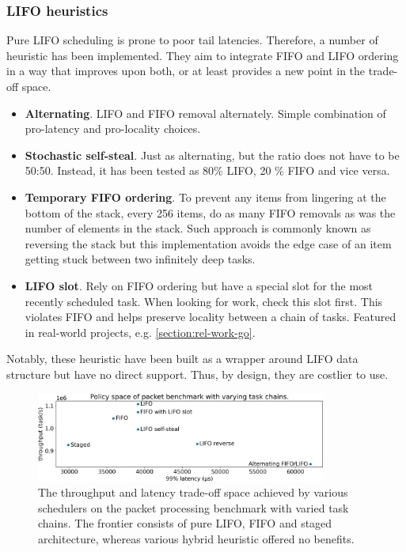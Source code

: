 \documentclass[12pt,a4paper,twoside]{report}
\begin{document}
\subsubsection{LIFO heuristics}
\label{section:lifo-heuristics}

Pure LIFO scheduling is prone to poor tail latencies. Therefore, a number of heuristic has been implemented. They aim to integrate FIFO and LIFO ordering in a way that improves upon both, or at least provides a new point in the trade-off space.
\begin{itemize}
    \item \textbf{Alternating}. LIFO and FIFO removal alternately. Simple combination of pro-latency and pro-locality choices. 
    \item \textbf{Stochastic self-steal}. Just as alternating, but the ratio does not have to be 50:50. Instead, it has been tested as 80\% LIFO, 20 \% FIFO and vice versa.  
    \item \textbf{Temporary FIFO ordering}. To prevent any items from lingering at the bottom of the stack, every 256 items, do as many FIFO removals as was the number of elements in the stack. Such approach is commonly known as reversing the stack but this implementation avoids the edge case of an item getting stuck between two infinitely deep tasks.
    \item \textbf{LIFO slot}. Rely on FIFO ordering but have a special slot for the most recently scheduled task. When looking for work, check this slot first. This violates FIFO and helps preserve locality between a chain of tasks. Featured in real-world projects, e.g. \ref{section:rel-work-go}. 
\end{itemize}
Notably, these heuristic have been built as a wrapper around LIFO data structure but have no direct support. Thus, by design, they are costlier to use. 

\begin{figure} 
    \centering 
    \includegraphics[width=0.85\textwidth]{eval/packet-basic-base-hybrids.png}
    \caption{The throughput and latency trade-off space achieved by various schedulers on the packet processing benchmark with varied task chains. The frontier consists of pure LIFO, FIFO and staged architecture, whereas various hybrid heuristic offered no benefits.}
   \label{fig:packet-hybrids}
\end{figure}
\end{document}
